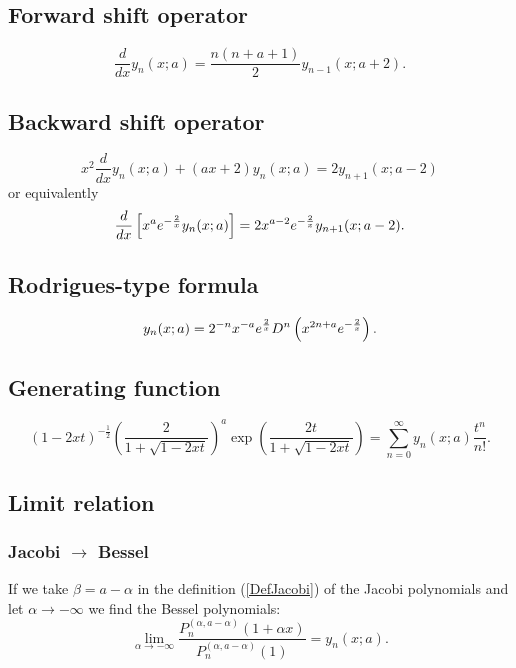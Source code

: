 \documentclass[envcountchap,graybox]{svmono}
\begin{document}
\subsection*{Forward shift operator}
\begin{equation}
\label{shift1Bessel}
\frac{d}{dx}y_n(x;a)=\frac{n(n+a+1)}{2}y_{n-1}(x;a+2).
\end{equation}

\subsection*{Backward shift operator}
\begin{equation}
\label{shift2BesselI}
x^2\frac{d}{dx}y_n(x;a)+(ax+2)y_n(x;a)=2y_{n+1}(x;a-2)
\end{equation}
or equivalently
\begin{equation}
\label{shift2BesselII}
\frac{d}{dx}\left[x^a{e}^{-\frac{2}{x}}y_n(x;a)\right]=2x^{a-2}{e}^{-\frac{2}{x}}y_{n+1}(x;a-2).
\end{equation}

\subsection*{Rodrigues-type formula}
\begin{equation}
\label{RodBessel}
y_n(x;a)=2^{-n}x^{-a}{e}^{\frac{2}{x}}D^n\left(x^{2n+a}{e}^{-\frac{2}{x}}\right).
\end{equation}

\subsection*{Generating function}
\begin{equation}
\label{GenBessel}
\left(1-2xt\right)^{-\frac{1}{2}}\left(\frac{2}{1+\sqrt{1-2xt}}\right)^a
\exp\left(\frac{2t}{1+\sqrt{1-2xt}}\right)=\sum_{n=0}^{\infty}y_n(x;a)\frac{t^n}{n!}.
\end{equation}

\subsection*{Limit relation}

\subsubsection*{Jacobi $\rightarrow$ Bessel}
If we take $\beta=a-\alpha$ in the definition (\ref{DefJacobi}) of the Jacobi polynomials
and let $\alpha\rightarrow -\infty$ we find the Bessel polynomials:
$$\lim_{\alpha\rightarrow -\infty}
\frac{P_n^{(\alpha,a-\alpha)}(1+\alpha x)}{P_n^{(\alpha,a-\alpha)}(1)}=y_n(x;a).$$
\end{document}
